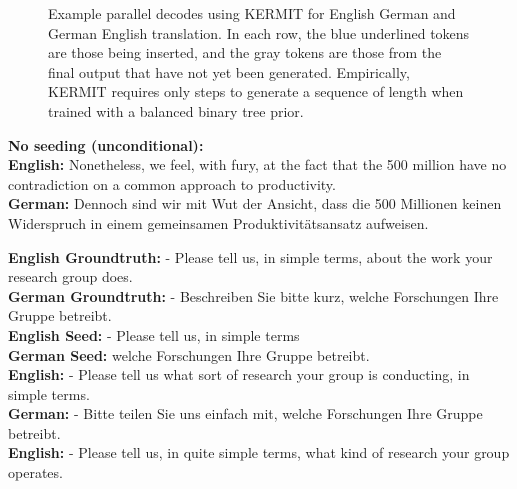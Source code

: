 \documentclass{article}
\newcommand{\gray}[1]{{\color{gray}#1}}
\newcommand{\black}[1]{{\color{black}#1}}
\begin{document}
\begin{figure}[t]
\begin{center}
{\begin{tikzpicture}[every node/.style={anchor=base,inner sep=0.1em}]
 \end{tikzpicture}
}
\end{center}
\vspace{-0.5em}
\parbox{\textwidth}{\dotfill}
\caption{Example parallel decodes using KERMIT for English  German and German  English translation. In each row, the blue underlined tokens are those being inserted, and the gray tokens are those from the final output that have not yet been generated. Empirically, KERMIT requires only  steps to generate a sequence of length  when trained with a balanced binary tree prior.}
\label{fig:mt_btree_decodes}
\end{figure}

\begin{figure*}[t]
\small
\begin{flushleft}
\textbf{No seeding (unconditional):} \\
\vspace{0.5em}
\textbf{English:} Nonetheless, we feel, with fury, at the fact that the 500 million have no contradiction on a common approach to productivity. \\
\textbf{German:} Dennoch sind wir mit Wut der Ansicht, dass die 500 Millionen keinen Widerspruch in einem gemeinsamen Produktivitätsansatz aufweisen.
\end{flushleft}
\vspace{-0.25em}
\parbox{\textwidth}{\dotfill}
\begin{flushleft}
\textbf{English Groundtruth:} - Please tell us, in simple terms, about the work your research group does. \\
\textbf{German Groundtruth:} - Beschreiben Sie bitte kurz, welche Forschungen Ihre Gruppe betreibt. \\
\vspace{0.5em}
\textbf{English Seed:} \gray{- Please tell us, in simple terms} \\
\textbf{German Seed:} \gray{welche Forschungen Ihre Gruppe betreibt.} \\
\vspace{0.5em}
\textbf{English:} \gray{- Please tell us} \black{what sort of research your group is conducting}\gray{, in simple terms}\black{.} \\
\textbf{German:} \black{- Bitte teilen Sie uns einfach mit,} \gray{welche Forschungen Ihre Gruppe betreibt.} \\
\vspace{0.5em}
\textbf{English:} \gray{- Please tell us, in} \black{quite} \gray{simple terms}\black{, what kind of research your group operates.} \\

\end{flushleft}
\end{figure*}
\end{document}
